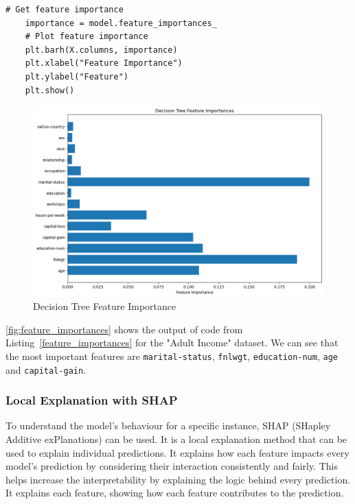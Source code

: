 \documentclass[10pt,journal,compsoc]{IEEEtran}
\begin{document}
\begin{lstlisting}[caption=Feature Importance, label=feature_importances]
    # Get feature importance
    importance = model.feature_importances_
    # Plot feature importance
    plt.barh(X.columns, importance)
    plt.xlabel("Feature Importance")
    plt.ylabel("Feature")
    plt.show()    
\end{lstlisting}

\begin{figure}[H]
    \centering
    \includegraphics[width=1\linewidth]{images/feature_importance_global.png}    
    \caption{Decision Tree Feature Importance}
    \label{fig:feature_importances}
\end{figure}

\autoref{fig:feature_importances} shows the output of code from Listing~\ref{feature_importances} for the "Adult Income" dataset. We can see that the most important features are \texttt{marital-status}, \texttt{fnlwgt}, \texttt{education-num}, \texttt{age} and \texttt{capital-gain}.


\subsubsection{Local Explanation with SHAP}

To understand the model's behaviour for a specific instance, SHAP (SHapley Additive exPlanations) can be used. It is a local explanation method that can be used to explain individual predictions. It explains how each feature impacts every model's prediction by considering their interaction consistently and fairly. This helps increase the interpretability by explaining the logic behind every prediction.\cite{why-trust-you}
It explains each feature, showing how each feature contributes to the prediction. 
\end{document}
